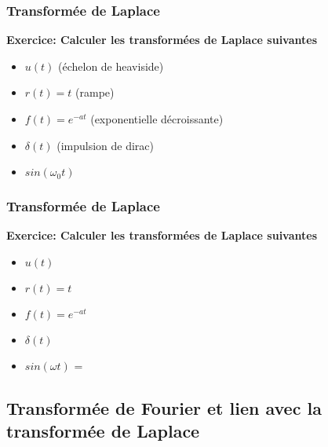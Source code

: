 \documentclass{beamer}
\begin{document}
\begin{frame} 
\frametitle{Transformée de Laplace}

\textbf{Exercice: Calculer les transformées de Laplace suivantes}\\
\vspace{1cm}
\begin{itemize}
\item $u(t)$ (échelon de heaviside)
\vspace{0.2cm}
\item $r(t) = t$ (rampe)
\vspace{0.2cm}
\item $f(t) = e^{-at}$ (exponentielle décroissante)
\vspace{0.2cm}
\item $\delta (t)$ (impulsion de dirac) 
\vspace{0.2cm}
\item $sin(\omega_0 t)$
\end{itemize}

\end{frame} 

\begin{frame} 
\frametitle{Transformée de Laplace}

\textbf{Exercice: Calculer les transformées de Laplace suivantes}\\
\vspace{1cm}
\begin{itemize}
\item $u(t)$   
\vspace{0.2cm}
\item $r(t) = t$  
\vspace{0.2cm}
\item $f(t) = e^{-at}$  
\vspace{0.2cm}
\item $\delta (t)$  
\vspace{0.2cm}
\item $sin(\omega t)$ = 
\end{itemize}

\end{frame}

\subsection{Transformée de Fourier et lien avec la transformée de Laplace}
\end{document}
